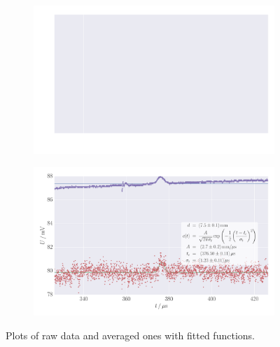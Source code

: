 \begin{figure}
    \centering
    \begin{subfigure}[b]{\pltw}
        \includegraphics[width=1.0\linewidth]{figures/haynes_shockley_raw_17}
        \caption{}
        \label{fig:h_s_raw_17}
    \end{subfigure}
    \begin{subfigure}[b]{\pltw}
        \includegraphics[width=1.0\linewidth]{figures/haynes_shockley_raw_18}
        \caption{}
        \label{fig:h_s_raw_18}
    \end{subfigure}
    \caption{
        Plots of raw data and averaged ones with fitted functions. 
        }
    \label{fig:h_s_raw_plots}
\end{figure}
